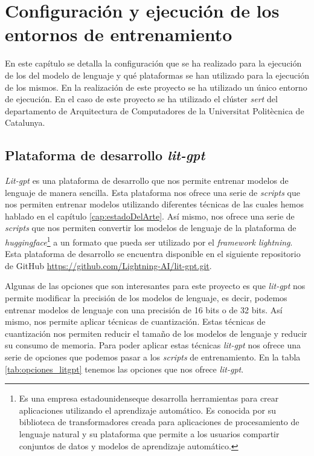 \chapter{Configuración y ejecución de los entornos de entrenamiento}
\label{cap:configuracion_ejecucion}


En este capítulo se detalla la configuración que se ha realizado para la ejecución de los
del modelo de lenguaje y qué plataformas se han utilizado para la ejecución de los mismos.
En la realización de este proyecto se ha utilizado un único entorno de ejecución. En el caso
de este proyecto se ha utilizado el clúster \textit{sert} del departamento de Arquitectura de
Computadores de la Universitat Politècnica de Catalunya.

\section{Plataforma de desarrollo \textit{lit-gpt}}
\label{sec:lit_gpt}


\textit{Lit-gpt} es una plataforma de desarrollo que nos permite entrenar modelos de
lenguaje de manera sencilla. Esta plataforma nos ofrece una serie de \textit{scripts} que nos
permiten entrenar modelos utilizando diferentes técnicas de las cuales hemos hablado
en el capítulo \ref{cap:estadoDelArte}. Así mismo, nos ofrece una serie de \textit{scripts} que nos permiten convertir
los modelos de lenguaje de la plataforma de \textit{huggingface}\footnote{Es una empresa
estadounidenseque desarrolla herramientas para crear aplicaciones utilizando el
aprendizaje automático. Es conocida por su biblioteca de transformadores creada para
aplicaciones de procesamiento de lenguaje natural y su plataforma que permite a los
usuarios compartir conjuntos de datos y modelos de aprendizaje automático.\cite{HuggingFace}} a un formato que pueda
ser utilizado por el \textit{framework lightning}. Esta plataforma de desarrollo se encuentra
disponible en el siguiente repositorio de GitHub \url{https://github.com/Lightning-AI/lit-gpt.git}.

Algunas de las opciones que son interesantes para este proyecto es que \textit{lit-gpt} nos
permite modificar la precisión de los modelos de lenguaje, es decir, podemos entrenar
modelos de lenguaje con una precisión de 16 bits o de 32 bits. Así mismo, nos permite
aplicar técnicas de cuantización. Estas técnicas de cuantización nos permiten reducir
el tamaño de los modelos de lenguaje y reducir su consumo de memoria.
Para poder aplicar estas técnicas \textit{lit-gpt} nos ofrece una serie de opciones que
podemos pasar a los \textit{scripts} de entrenamiento. En la tabla \ref{tab:opciones_litgpt} 
tenemos las opciones que nos ofrece \textit{lit-gpt}.

